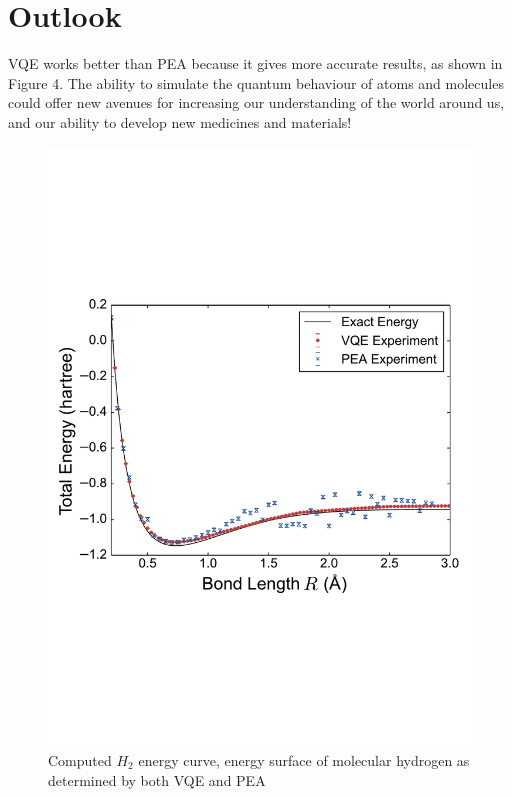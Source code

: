 \documentclass[14pt,landscape,color=UCLdarkred,margin=3cm]{uclposter}
\begin{document}
\begin{multicols}{3}
\begin{figure}[H]
   
\end{figure}



\section*{Outlook}

VQE works better than PEA because it gives more accurate results, as shown in Figure 4. The ability to simulate the quantum behaviour of atoms and molecules could offer new avenues for increasing our understanding of the world around us, and our ability to develop new medicines and materials!

\begin{figure}[H]
  \begin{center}
  \includegraphics[scale=1.45]{result.pdf}
  \caption{Computed $H_2$ energy curve, energy surface of molecular hydrogen as determined by both VQE and PEA}
  \end{center}
    
 

   
\end{figure}



\end{multicols}
	
\end{document}
